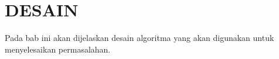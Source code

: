 \chapter{DESAIN}

Pada bab ini akan dijelaskan desain algoritma yang akan digunakan untuk menyelesaikan permasalahan.

